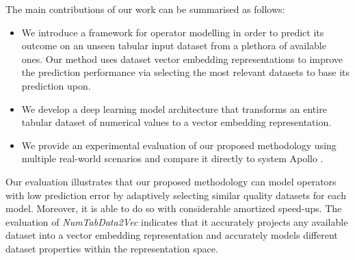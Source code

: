 The main contributions of our work can be summarised as follows:
\begin{itemize}
\item We introduce a framework for operator modelling in order to predict its outcome on an unseen tabular input dataset from a plethora of available ones. Our method uses dataset vector embedding representations to improve the prediction performance via selecting the most relevant datasets to base its prediction upon.
\item We develop a deep learning model architecture that transforms an entire tabular dataset of numerical values to a vector embedding representation.
\item We provide an experimental evaluation of our proposed methodology using multiple real-world scenarios and compare it directly to system Apollo \cite{b7Apollo1, b7Apollo2}.
\end{itemize}
Our evaluation illustrates that our proposed methodology can model operators with low prediction error by adaptively selecting similar quality datasets for each model. Moreover, it is able to do so with considerable amortized speed-ups. The evaluation of \textit{NumTabData2Vec} indicates that it accurately projects any available dataset into a vector embedding representation and accurately models different dataset properties within the representation space. %





